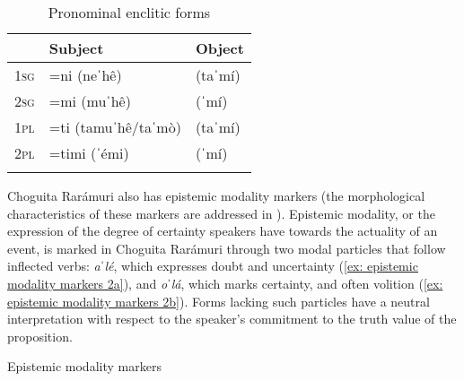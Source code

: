 \begin{table}
\caption{Pronominal enclitic forms}
\label{tab:key:21}

\begin{tabularx}{.5\textwidth}{lll}
\lsptoprule
& \textbf{Subject} & \textbf{Object}\\
\midrule
 \textsc{1sg} & =ni (neˈhê) & (taˈmí)\\
 \textsc{2sg} & =mi (muˈhê) & (ˈmí)\\
 \textsc{1pl} & =ti (tamuˈhê/taˈmò) & (taˈmí)\\
 \textsc{2pl} & =timi (ˈémi) & (ˈmí)\\
\lspbottomrule
\end{tabularx}
\end{table}

Choguita Rarámuri also has epistemic modality markers (the morphological characteristics of these markers are addressed in ). Epistemic modality, or the expression of the degree of certainty speakers have towards the actuality of an event, is marked in Choguita Rarámuri through two modal particles that follow inflected verbs: \textit{aˈlé}, which expresses doubt and uncertainty (\ref{ex: epistemic modality markers 2a}), and \textit{oˈlá}, which marks certainty, and often volition (\ref{ex: epistemic modality markers 2b}). Forms lacking such particles have a neutral interpretation with respect to the speaker’s commitment to the truth value of the proposition.

\ea\label{ex: epistemic modality markers 2}
{Epistemic modality markers }

    \label{ex: epistemic modality markers 2a}
        \label{ex: epistemic modality markers 2b}
    \z
\z

